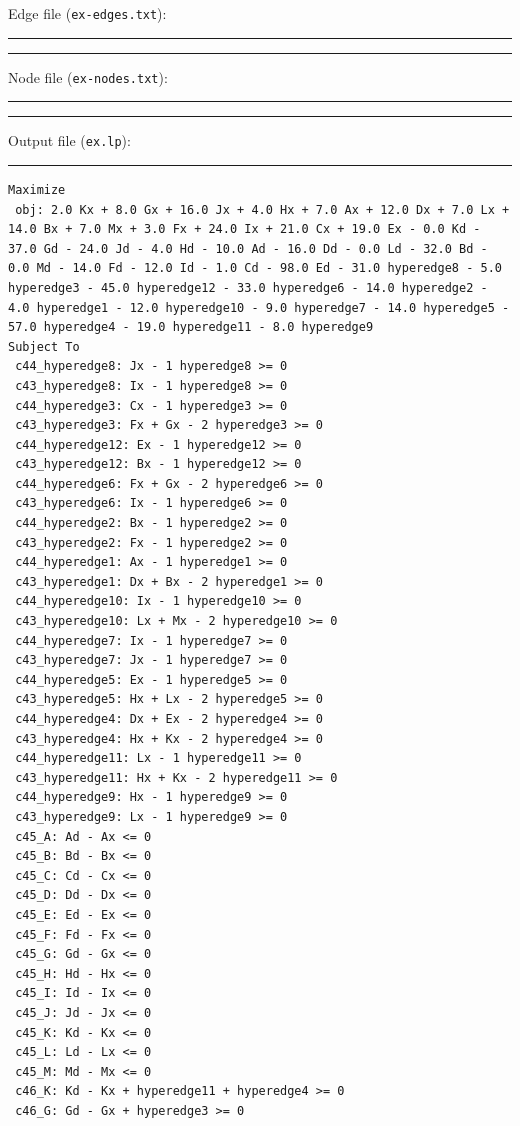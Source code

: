 \documentclass[12pt,twoside]{reedthesis}
\theoremstyle{definition}
\begin{document}
        Edge file (\texttt{ex-edges.txt}):\\
        \rule{\textwidth}{1pt}
        
        \rule{\textwidth}{1pt}

        \newpage

        Node file (\texttt{ex-nodes.txt}):\\
        \rule{\textwidth}{1pt}
        
        \rule{\textwidth}{1pt}

        \newpage

        Output file (\texttt{ex.lp}):\\
        \rule{\textwidth}{1pt}
        \begin{lstlisting}
Maximize
 obj: 2.0 Kx + 8.0 Gx + 16.0 Jx + 4.0 Hx + 7.0 Ax + 12.0 Dx + 7.0 Lx + 14.0 Bx + 7.0 Mx + 3.0 Fx + 24.0 Ix + 21.0 Cx + 19.0 Ex - 0.0 Kd - 37.0 Gd - 24.0 Jd - 4.0 Hd - 10.0 Ad - 16.0 Dd - 0.0 Ld - 32.0 Bd - 0.0 Md - 14.0 Fd - 12.0 Id - 1.0 Cd - 98.0 Ed - 31.0 hyperedge8 - 5.0 hyperedge3 - 45.0 hyperedge12 - 33.0 hyperedge6 - 14.0 hyperedge2 - 4.0 hyperedge1 - 12.0 hyperedge10 - 9.0 hyperedge7 - 14.0 hyperedge5 - 57.0 hyperedge4 - 19.0 hyperedge11 - 8.0 hyperedge9
Subject To
 c44_hyperedge8: Jx - 1 hyperedge8 >= 0
 c43_hyperedge8: Ix - 1 hyperedge8 >= 0
 c44_hyperedge3: Cx - 1 hyperedge3 >= 0
 c43_hyperedge3: Fx + Gx - 2 hyperedge3 >= 0
 c44_hyperedge12: Ex - 1 hyperedge12 >= 0
 c43_hyperedge12: Bx - 1 hyperedge12 >= 0
 c44_hyperedge6: Fx + Gx - 2 hyperedge6 >= 0
 c43_hyperedge6: Ix - 1 hyperedge6 >= 0
 c44_hyperedge2: Bx - 1 hyperedge2 >= 0
 c43_hyperedge2: Fx - 1 hyperedge2 >= 0
 c44_hyperedge1: Ax - 1 hyperedge1 >= 0
 c43_hyperedge1: Dx + Bx - 2 hyperedge1 >= 0
 c44_hyperedge10: Ix - 1 hyperedge10 >= 0
 c43_hyperedge10: Lx + Mx - 2 hyperedge10 >= 0
 c44_hyperedge7: Ix - 1 hyperedge7 >= 0
 c43_hyperedge7: Jx - 1 hyperedge7 >= 0
 c44_hyperedge5: Ex - 1 hyperedge5 >= 0
 c43_hyperedge5: Hx + Lx - 2 hyperedge5 >= 0
 c44_hyperedge4: Dx + Ex - 2 hyperedge4 >= 0
 c43_hyperedge4: Hx + Kx - 2 hyperedge4 >= 0
 c44_hyperedge11: Lx - 1 hyperedge11 >= 0
 c43_hyperedge11: Hx + Kx - 2 hyperedge11 >= 0
 c44_hyperedge9: Hx - 1 hyperedge9 >= 0
 c43_hyperedge9: Lx - 1 hyperedge9 >= 0
 c45_A: Ad - Ax <= 0
 c45_B: Bd - Bx <= 0
 c45_C: Cd - Cx <= 0
 c45_D: Dd - Dx <= 0
 c45_E: Ed - Ex <= 0
 c45_F: Fd - Fx <= 0
 c45_G: Gd - Gx <= 0
 c45_H: Hd - Hx <= 0
 c45_I: Id - Ix <= 0
 c45_J: Jd - Jx <= 0
 c45_K: Kd - Kx <= 0
 c45_L: Ld - Lx <= 0
 c45_M: Md - Mx <= 0
 c46_K: Kd - Kx + hyperedge11 + hyperedge4 >= 0
 c46_G: Gd - Gx + hyperedge3 >= 0

\end{lstlisting}
\end{document}

